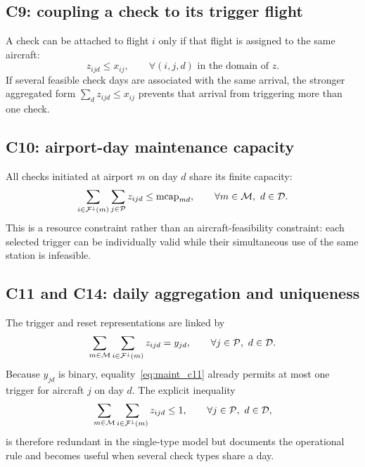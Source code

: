 \subsection{C9: coupling a check to its trigger flight}

A check can be attached to flight $i$ only if that flight is assigned to the
same aircraft:
\begin{equation}
    z_{ijd}\leq x_{ij},
    \qquad
    \forall(i,j,d)\text{ in the domain of }z.
    \label{eq:maint_c9}
\end{equation}
If several feasible check days are associated with the same arrival, the
stronger aggregated form $\sum_d z_{ijd}\leq x_{ij}$ prevents that arrival
from triggering more than one check.

\subsection{C10: airport-day maintenance capacity}

All checks initiated at airport $m$ on day $d$ share its finite capacity:
\begin{equation}
    \sum_{i\in\mathcal{F}^{\downarrow}(m)}\sum_{j\in\mathcal{P}}z_{ijd}
    \leq\operatorname{mcap}_{md},
    \qquad \forall m\in\mathcal{M},\ d\in\mathcal{D}.
    \label{eq:maint_c10}
\end{equation}
This is a resource constraint rather than an aircraft-feasibility constraint:
each selected trigger can be individually valid while their simultaneous use
of the same station is infeasible.

\subsection{C11 and C14: daily aggregation and uniqueness}

The trigger and reset representations are linked by
\begin{equation}
    \sum_{m\in\mathcal{M}}\sum_{i\in\mathcal{F}^{\downarrow}(m)}z_{ijd}=y_{jd},
    \qquad \forall j\in\mathcal{P},\ d\in\mathcal{D}.
    \label{eq:maint_c11}
\end{equation}
Because $y_{jd}$ is binary, equality~\eqref{eq:maint_c11} already permits at
most one trigger for aircraft $j$ on day $d$. The explicit inequality
\begin{equation}
    \sum_{m\in\mathcal{M}}\sum_{i\in\mathcal{F}^{\downarrow}(m)}z_{ijd}\leq1,
    \qquad \forall j\in\mathcal{P},\ d\in\mathcal{D},
    \label{eq:maint_c14}
\end{equation}
is therefore redundant in the single-type model but documents the operational
rule and becomes useful when several check types share a day.

